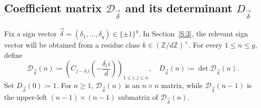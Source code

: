 \documentclass{amsart}
\theoremstyle{plain}
\theoremstyle{remark}
\newcommand{\cD}{\mathcal{D}}
\newcommand{\1}{\mathbf{1}}
\newcommand{\Z}{\mathbb{Z}}
\newcommand{\bdelta}{{\vec\delta}}
\begin{document}
\subsection{\texorpdfstring{Coefficient matrix $\cD_\bdelta$ and its determinant
$D_\bdelta$}{Coefficient matrix and its determinant}}

Fix a sign vector $\bdelta
=(\delta_1,\ldots,\delta_g)
\in\{\pm 1\}^g$. In Section~\ref{S:3}, the relevant sign vector
will be obtained from a residue class $k\in(\Z/d\Z)^\times$.
For every $1\le n\le g$, define
\begin{equation}\label{E:D(n)}
\cD_\bdelta(n)\coloneqq \left(C_{j-\delta_i i}\left(-\frac{\delta_i i}{d}\right)
\right)_{1\le i,j\le n},\quad
D_\bdelta(n)\coloneqq \det \cD_\bdelta(n).
\end{equation}
Set $D_\bdelta(0)\coloneqq 1$.
For $n\ge 1$, $\cD_\bdelta(n)$
is an $n\times n$ matrix, while $\cD_\bdelta(n-1)$
is the upper-left $(n-1)\times (n-1)$ submatrix of $\cD_\bdelta(n)$.
\end{document}
